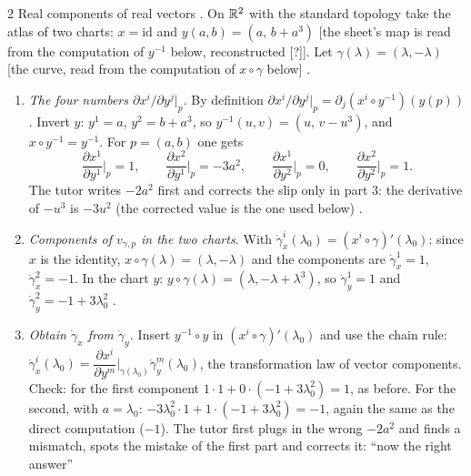 \begin{paracol}{2}
Real components of real vectors . On $\mathbb{R}^2$ with the standard topology take the atlas of two charts: $x=\mathrm{id}$ and $y(a,b)=(a,\,b+a^3)$ [the sheet's map is read from the computation of $y^{-1}$ below, reconstructed [?]]. Let $\gamma(\lambda)=(\lambda,-\lambda)$ [the curve, read from the computation of $x\circ\gamma$ below]
.
\begin{enumerate}
  \item \emph{The four numbers $\partial x^i/\partial y^j|_p$.} By definition $\partial x^i/\partial y^j|_p=\partial_j(x^i\circ y^{-1})(y(p))$. Invert $y$: $y^1=a$, $y^2=b+a^3$, so $y^{-1}(u,v)=(u,\,v-u^3)$, and $x\circ y^{-1}=y^{-1}$. For $p=(a,b)$ one gets
        \[
          \frac{\partial x^1}{\partial y^1}\Big|_p=1,\qquad\frac{\partial x^2}{\partial y^1}\Big|_p=-3a^2,\qquad\frac{\partial x^1}{\partial y^2}\Big|_p=0,\qquad\frac{\partial x^2}{\partial y^2}\Big|_p=1.
        \]
        The tutor writes $-2a^2$ first and corrects the slip only in part 3: the derivative of $-u^3$ is $-3u^2$ (the corrected value is the one used below) .
  \item \emph{Components of $v_{\gamma,p}$ in the two charts.} With $\dot\gamma^i_x(\lambda_0)=(x^i\circ\gamma)'(\lambda_0)$: since $x$ is the identity, $x\circ\gamma(\lambda)=(\lambda,-\lambda)$ and the components are $\dot\gamma^1_x=1$, $\dot\gamma^2_x=-1$. In the chart $y$: $y\circ\gamma(\lambda)=(\lambda,-\lambda+\lambda^3)$, so $\dot\gamma^1_y=1$ and $\dot\gamma^2_y=-1+3\lambda_0^2$
        .
  \item \emph{Obtain $\dot\gamma_x$ from $\dot\gamma_y$.} Insert $y^{-1}\circ y$ in $(x^i\circ\gamma)'(\lambda_0)$ and use the chain rule: $\dot\gamma^i_x(\lambda_0)=\dfrac{\partial x^i}{\partial y^m}\Big|_{\gamma(\lambda_0)}\dot\gamma^m_y(\lambda_0)$, the transformation law of vector components. Check: for the first component $1\cdot1+0\cdot(-1+3\lambda_0^2)=1$, as before. For the second, with $a=\lambda_0$:
        $-3\lambda_0^2\cdot1+1\cdot(-1+3\lambda_0^2)=-1$, again the same as the direct computation ($-1$). The tutor first plugs in the wrong $-2a^2$ and finds a mismatch, spots the mistake of the first part and corrects it: ``now the right answer''

\end{enumerate}
\end{paracol}

